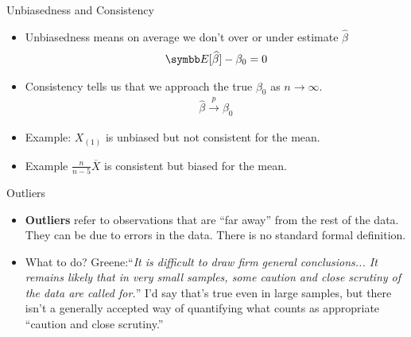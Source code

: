 \documentclass[aspectratio=169,11pt]{beamer}
\begin{document}
\begin{frame}{Unbiasedness and Consistency}
\begin{itemize}
\item Unbiasedness means on average we don't over or under estimate $\widehat{\beta}$
\begin{align*}
\E[\widehat{\beta} ] - \beta_0 = 0
\end{align*}
\item Consistency tells us that we approach the true $\beta_0$ as $n \rightarrow \infty$.
\begin{align*}
\widehat{\beta}  \overset{p}{\to} \beta_0
\end{align*}
\item Example: $X_{(1)}$ is unbiased but not consistent for the mean.
\item Example $\frac{n}{n-5} \overline{X}$ is consistent but biased for the mean.
\end{itemize}
\end{frame}



\begin{frame}{Outliers}
\begin{itemize}
	\item {\bf Outliers} refer to observations that are ``far away'' from the rest of the data. 
	They can be due to errors in the data.  There is no standard formal definition. 

	\medskip
	\item What to do? Greene:``\emph{It is difficult to draw firm general conclusions... It remains likely that in very
	small samples, some caution and close scrutiny of the data are called for.}'' I'd say that's true even in large samples,
	but there isn't a generally accepted way of quantifying what counts as appropriate ``caution and close scrutiny.''


\end{itemize}
\end{frame}
\end{document}
